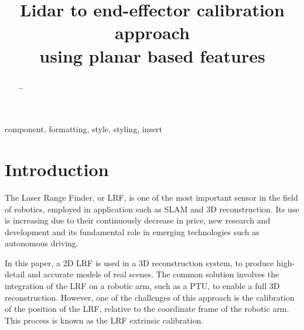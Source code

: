 \documentclass[conference]{IEEEtran}
\begin{document}
\title{Lidar to end-effector calibration approach\\ using planar based features}

\author{
\and
{}
\and
{}
}

\maketitle

\begin{abstract}
\dots
\end{abstract}

\begin{IEEEkeywords}
component, formatting, style, styling, insert
\end{IEEEkeywords}

\section{Introduction}\label{section:introduction}

The Laser Range Finder, or LRF, is one of the most important sensor in the field of robotics, employed in application such as SLAM and 3D reconstruction. Its use is increasing due to their continuously decrease in price, new research and development and its fundamental role in emerging technologies such as autonomous driving.

In this paper, a 2D LRF is used in a 3D reconstruction system, to produce high-detail and accurate models of real scenes. The common solution involves the integration of the LRF on a robotic arm, such as a PTU, to enable a full 3D reconstruction. However, one of the challenges of this approach is the calibration of the position of the LRF, relative to the coordinate frame of the robotic arm. This process is known as the LRF extrinsic calibration.
\end{document}
